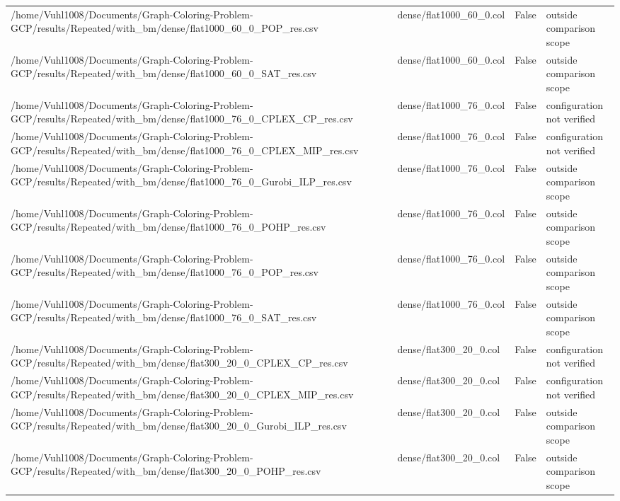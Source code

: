 \begin{table}[htbp]
\begin{tabular}{llll}
/home/Vuhl1008/Documents/Graph-Coloring-Problem-GCP/results/Repeated/with\_bm/dense/flat1000\_60\_0\_POP\_res.csv & dense/flat1000\_60\_0.col & False & outside comparison scope \\
/home/Vuhl1008/Documents/Graph-Coloring-Problem-GCP/results/Repeated/with\_bm/dense/flat1000\_60\_0\_SAT\_res.csv & dense/flat1000\_60\_0.col & False & outside comparison scope \\
/home/Vuhl1008/Documents/Graph-Coloring-Problem-GCP/results/Repeated/with\_bm/dense/flat1000\_76\_0\_CPLEX\_CP\_res.csv & dense/flat1000\_76\_0.col & False & configuration not verified \\
/home/Vuhl1008/Documents/Graph-Coloring-Problem-GCP/results/Repeated/with\_bm/dense/flat1000\_76\_0\_CPLEX\_MIP\_res.csv & dense/flat1000\_76\_0.col & False & configuration not verified \\
/home/Vuhl1008/Documents/Graph-Coloring-Problem-GCP/results/Repeated/with\_bm/dense/flat1000\_76\_0\_Gurobi\_ILP\_res.csv & dense/flat1000\_76\_0.col & False & outside comparison scope \\
/home/Vuhl1008/Documents/Graph-Coloring-Problem-GCP/results/Repeated/with\_bm/dense/flat1000\_76\_0\_POHP\_res.csv & dense/flat1000\_76\_0.col & False & outside comparison scope \\
/home/Vuhl1008/Documents/Graph-Coloring-Problem-GCP/results/Repeated/with\_bm/dense/flat1000\_76\_0\_POP\_res.csv & dense/flat1000\_76\_0.col & False & outside comparison scope \\
/home/Vuhl1008/Documents/Graph-Coloring-Problem-GCP/results/Repeated/with\_bm/dense/flat1000\_76\_0\_SAT\_res.csv & dense/flat1000\_76\_0.col & False & outside comparison scope \\
/home/Vuhl1008/Documents/Graph-Coloring-Problem-GCP/results/Repeated/with\_bm/dense/flat300\_20\_0\_CPLEX\_CP\_res.csv & dense/flat300\_20\_0.col & False & configuration not verified \\
/home/Vuhl1008/Documents/Graph-Coloring-Problem-GCP/results/Repeated/with\_bm/dense/flat300\_20\_0\_CPLEX\_MIP\_res.csv & dense/flat300\_20\_0.col & False & configuration not verified \\
/home/Vuhl1008/Documents/Graph-Coloring-Problem-GCP/results/Repeated/with\_bm/dense/flat300\_20\_0\_Gurobi\_ILP\_res.csv & dense/flat300\_20\_0.col & False & outside comparison scope \\
/home/Vuhl1008/Documents/Graph-Coloring-Problem-GCP/results/Repeated/with\_bm/dense/flat300\_20\_0\_POHP\_res.csv & dense/flat300\_20\_0.col & False & outside comparison scope \\

\end{tabular}
\end{table}
